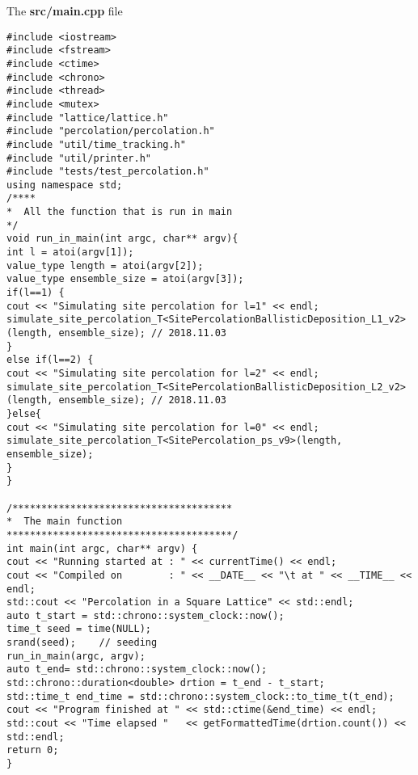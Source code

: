 
The \textbf{src/main.cpp} file

\begin{lstlisting}[style=CStyle]
#include <iostream>
#include <fstream>
#include <ctime>
#include <chrono>
#include <thread>
#include <mutex>
#include "lattice/lattice.h"
#include "percolation/percolation.h"
#include "util/time_tracking.h"
#include "util/printer.h"
#include "tests/test_percolation.h"
using namespace std;
/****
*  All the function that is run in main
*/
void run_in_main(int argc, char** argv){
int l = atoi(argv[1]);
value_type length = atoi(argv[2]);
value_type ensemble_size = atoi(argv[3]);
if(l==1) {
cout << "Simulating site percolation for l=1" << endl;
simulate_site_percolation_T<SitePercolationBallisticDeposition_L1_v2>(length, ensemble_size); // 2018.11.03
}
else if(l==2) {
cout << "Simulating site percolation for l=2" << endl;
simulate_site_percolation_T<SitePercolationBallisticDeposition_L2_v2>(length, ensemble_size); // 2018.11.03
}else{
cout << "Simulating site percolation for l=0" << endl;
simulate_site_percolation_T<SitePercolation_ps_v9>(length, ensemble_size);
}
}

/**************************************
*  The main function
***************************************/
int main(int argc, char** argv) {
cout << "Running started at : " << currentTime() << endl;
cout << "Compiled on        : " << __DATE__ << "\t at " << __TIME__ << endl;
std::cout << "Percolation in a Square Lattice" << std::endl;
auto t_start = std::chrono::system_clock::now();
time_t seed = time(NULL);
srand(seed);    // seeding
run_in_main(argc, argv);
auto t_end= std::chrono::system_clock::now();
std::chrono::duration<double> drtion = t_end - t_start;
std::time_t end_time = std::chrono::system_clock::to_time_t(t_end);
cout << "Program finished at " << std::ctime(&end_time) << endl;
std::cout << "Time elapsed "   << getFormattedTime(drtion.count()) << std::endl;
return 0;
}
\end{lstlisting}